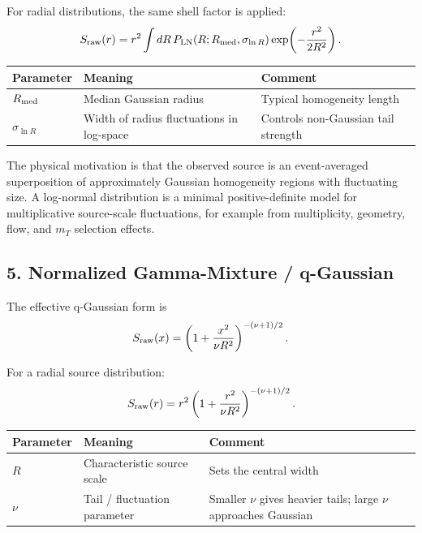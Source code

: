 \documentclass[11pt]{article}
\begin{document}
For radial distributions, the same shell factor is applied:
\begin{equation}
  S_{\rm raw}(r)
  =
  r^2
  \int dR\,
  P_{\rm LN}(R;R_{\rm med},\sigma_{\ln R})
  \exp\!\left(-\frac{r^2}{2R^2}\right).
\end{equation}

\begin{center}
\begin{tabular}{lll}
\toprule
Parameter & Meaning & Comment \\
\midrule
\(R_{\rm med}\) & Median Gaussian radius & Typical homogeneity length \\
\(\sigma_{\ln R}\) & Width of radius fluctuations in log-space & Controls non-Gaussian tail strength \\
\bottomrule
\end{tabular}
\end{center}

The physical motivation is that the observed source is an event-averaged
superposition of approximately Gaussian homogeneity regions with fluctuating
size. A log-normal distribution is a minimal positive-definite model for
multiplicative source-scale fluctuations, for example from multiplicity,
geometry, flow, and \(m_T\) selection effects.

\subsection*{5. Normalized Gamma-Mixture / q-Gaussian}

The effective q-Gaussian form is
\begin{equation}
  S_{\rm raw}(x)
  =
  \left(
  1+\frac{x^2}{\nu R^2}
  \right)^{-(\nu+1)/2}.
\end{equation}

For a radial source distribution:
\begin{equation}
  S_{\rm raw}(r)
  =
  r^2
  \left(
  1+\frac{r^2}{\nu R^2}
  \right)^{-(\nu+1)/2}.
\end{equation}

\begin{center}
\begin{tabular}{lll}
\toprule
Parameter & Meaning & Comment \\
\midrule
\(R\) & Characteristic source scale & Sets the central width \\
\(\nu\) & Tail / fluctuation parameter & Smaller \(\nu\) gives heavier tails; large \(\nu\) approaches Gaussian \\
\bottomrule
\end{tabular}
\end{center}
\end{document}
